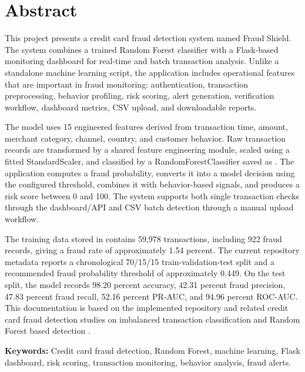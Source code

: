\documentclass[12pt,a4paper]{report}
\begin{document}
\newpage

\chapter*{Abstract}

This project presents a credit card fraud detection system named Fraud Shield. The system combines a trained Random Forest classifier with a Flask-based monitoring dashboard for real-time and batch transaction analysis. Unlike a standalone machine learning script, the application includes operational features that are important in fraud monitoring: authentication, transaction preprocessing, behavior profiling, risk scoring, alert generation, verification workflow, dashboard metrics, CSV upload, and downloadable reports.

The model uses 15 engineered features derived from transaction time, amount, merchant category, channel, country, and customer behavior. Raw transaction records are transformed by a shared feature engineering module, scaled using a fitted StandardScaler, and classified by a RandomForestClassifier saved as . The application computes a fraud probability, converts it into a model decision using the configured threshold, combines it with behavior-based signals, and produces a risk score between 0 and 100. The system supports both single transaction checks through the dashboard/API and CSV batch detection through a manual upload workflow.

The training data stored in  contains 59,978 transactions, including 922 fraud records, giving a fraud rate of approximately 1.54 percent. The current repository metadata reports a chronological 70/15/15 train-validation-test split and a recommended fraud probability threshold of approximately 0.449. On the test split, the model records 98.20 percent accuracy, 42.31 percent fraud precision, 47.83 percent fraud recall, 52.16 percent PR-AUC, and 94.96 percent ROC-AUC. This documentation is based on the implemented repository and related credit card fraud detection studies on imbalanced transaction classification and Random Forest based detection \cite{mallidi2021analysis,adesina2024creditcard,tadvi2021realtime}.

\vspace{0.5cm}
\noindent\textbf{Keywords:} Credit card fraud detection, Random Forest, machine learning, Flask dashboard, risk scoring, transaction monitoring, behavior analysis, fraud alerts.
\end{document}
